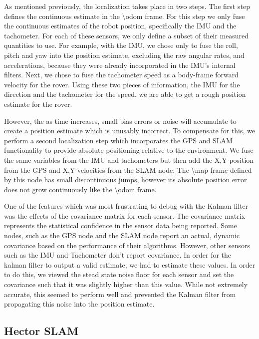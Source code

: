 As mentioned previously, the localization takes place in two steps. The first step defines the continuous estimate in the \textbackslash odom frame. For this step we only fuse the continuous estimates of the robot position, specifically the IMU and the tachometer. For each of these sensors, we only define a subset of their measured quantities to use. For example, with the IMU, we chose only to fuse the roll, pitch and yaw into the position estimate, excluding the raw angular rates, and accelerations, because they were already incorporated in the IMU's internal filters. Next, we chose to fuse the tachometer speed as a body-frame forward velocity for the rover. Using these two pieces of information, the IMU for the direction and the tachometer for the speed, we are able to get a rough position estimate for the rover. 

However, the as time increases, small bias errors or noise will accumulate to create a position estimate which is unusably incorrect. To compensate for this, we perform a second localization step which incorporates the GPS and SLAM functionality to provide absolute positioning relative to the environment. We fuse the same variables from the IMU and tachometers but then add the X,Y position from the GPS and X,Y velocities from the SLAM node. The \textbackslash map frame defined by this node has small discontinuous jumps, however its absolute position error does not grow continuously like the \textbackslash odom frame.

One of the features which was most frustrating to debug with the Kalman filter was the effects of the covariance matrix for each sensor. The covariance matrix represents the statistical confidence in the sensor data being reported. Some nodes, such as the GPS node and the SLAM node report an actual, dynamic covariance based on the performance of their algorithms. However, other sensors such as the IMU and Tachometer don't report covariance. In order for the kalman filter to output a valid estimate, we had to estimate these values. In order to do this, we viewed the stead state noise floor for each sensor and set the covariance such that it was slightly higher than this value. While not extremely accurate, this seemed to perform well and prevented the Kalman filter from propagating this noise into the position estimate.

\subsection{Hector SLAM}


